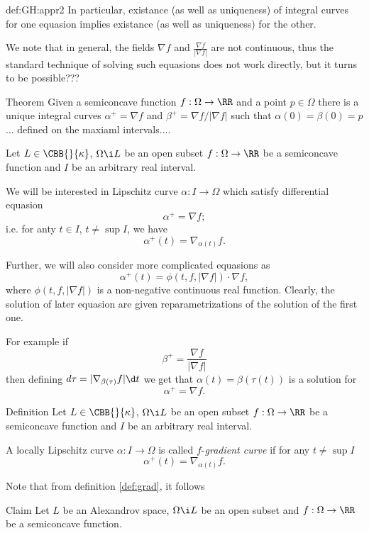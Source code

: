 {\begin{subthm}{def:GH:appr2}
In particular, existance (as well as uniqueness) of integral curves for one equasion implies existance (as well as uniqueness) for the other.

We note that in general, the fields $\nabla f$ and $\frac{\nabla f}{|\nabla f|}$ are not continuous, thus the standard technique of solving such equasions does not work directly, but it turns to be possible???

\begin{thm}{Theorem}
Given a semiconcave function $f:\Omega\to\RR$ and a point $p\in \Omega$ there is a unique integral curves
$\alpha^+=\nabla f$ and $\beta^+=\nabla f/|\nabla f|$ such that $\alpha(0)=\beta(0)=p$... defined on the maxiaml intervals....
\end{thm}




Let $L\in\CBB{}{\kappa}$, 
$\Omega\i L$ be an open subset 
$f:\Omega\to \RR$ be a semiconcave function
and $I$ be an arbitrary real interval. 

We will be interested in Lipschitz curve $\alpha:I\to\Omega$ which satisfy differential equasion
$$\alpha^+=\nabla f;$$
i.e. for anty $t\in I$, $t\not=\sup I$, we have
$$\alpha^+(t)=\nabla_{\alpha(t)}f.$$

Further, we will also consider more complicated equasions as
$$\alpha^+(t)=\phi(t,f,|\nabla f|)\cdot\nabla f,$$
where $\phi(t,f,|\nabla f|)$ is a non-negative continuous real function.
Clearly, the solution of later equasion are given reparametrizations of the solution of the first one. 

For example if 
$$\beta^+=\frac{\nabla f}{|\nabla f|}$$
then defining $d\tau=|\nabla_{\beta(\tau)}f|\d t$ we get that
$\alpha(t)=\beta(\tau(t))$ is a solution for 
$$\alpha^+=\nabla f.$$

\begin{thm}{Definition}\label{def:grad.curve} 
Let $L\in\CBB{}{\kappa}$, 
$\Omega\i L$ be an open subset 
$f:\Omega\to \RR$ be a semiconcave function
and $I$ be an arbitrary real interval. 

A locally Lipschitz curve $\alpha:I\to\Omega$ is called $f$-\emph{gradient curve} if for any $t\not=\sup I$
$$\alpha^+(t)=\nabla_{\alpha(t)}f.$$
\end{thm}

Note that from definition \ref{def:grad}, it follows 

\begin{thm}{Claim}\label{clm:grad.curve-def2}
Let $L$ be an Alexandrov space, $\Omega\i L$ be an open subset and $f:\Omega\to\RR$ be a semiconcave function.
 

\end{thm}
\end{subthm}}
